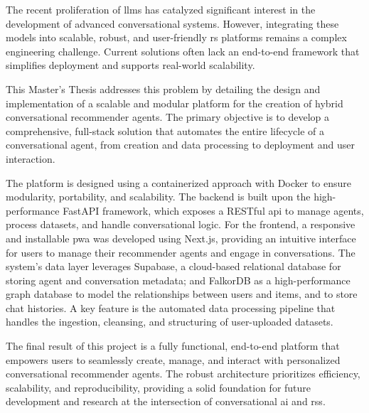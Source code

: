 
The recent proliferation of \acp{llm} has catalyzed significant interest in the development of advanced conversational systems. However, integrating these models into scalable, robust, and user-friendly \acl{rs} platforms remains a complex engineering challenge. Current solutions often lack an end-to-end framework that simplifies deployment and supports real-world scalability.

This Master's Thesis addresses this problem by detailing the design and implementation of a scalable and modular platform for the creation of hybrid conversational recommender agents. The primary objective is to develop a comprehensive, full-stack solution that automates the entire lifecycle of a conversational agent, from creation and data processing to deployment and user interaction.

The platform is designed using a containerized approach with Docker to ensure modularity, portability, and scalability. The backend is built upon the high-performance FastAPI framework, which exposes a RESTful \ac{api} to manage agents, process datasets, and handle conversational logic. For the frontend, a responsive and installable \ac{pwa} was developed using Next.js, providing an intuitive interface for users to manage their recommender agents and engage in conversations. The system's data layer leverages Supabase, a cloud-based relational database for storing agent and conversation metadata; and FalkorDB as a high-performance graph database to model the relationships between users and items, and to store chat histories. A key feature is the automated data processing pipeline that handles the ingestion, cleansing, and structuring of user-uploaded datasets.

The final result of this project is a fully functional, end-to-end platform that empowers users to seamlessly create, manage, and interact with personalized conversational recommender agents. The robust architecture prioritizes efficiency, scalability, and reproducibility, providing a solid foundation for future development and research at the intersection of conversational \acs{ai} and \acl{rs}s.

